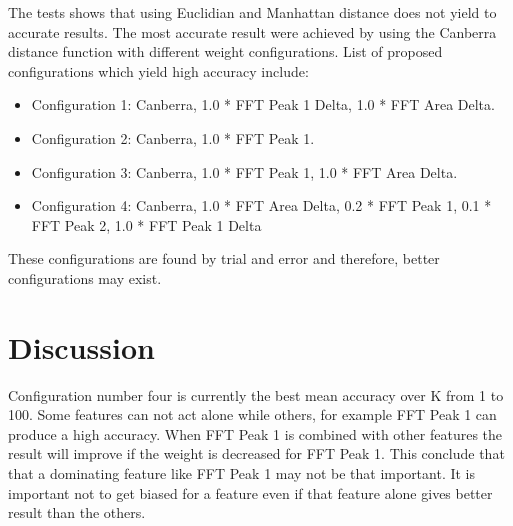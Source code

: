 The tests shows that using Euclidian and Manhattan distance does not yield to accurate results.
The most accurate result were achieved by using the Canberra distance function with different
weight configurations. List of proposed configurations which yield high accuracy include:
\begin{itemize}
  \item Configuration 1: Canberra, 1.0 * FFT Peak 1 Delta, 1.0 * FFT Area Delta.
  \item Configuration 2: Canberra, 1.0 * FFT Peak 1.
  \item Configuration 3: Canberra, 1.0 * FFT Peak 1, 1.0 * FFT Area Delta.
  \item Configuration 4: Canberra, 1.0 * FFT Area Delta, 0.2 * FFT Peak 1, 0.1 * FFT Peak 2, 1.0 * FFT Peak 1 Delta
\end{itemize}

These configurations are found by trial and error and therefore, better configurations may exist.

\section{Discussion}
Configuration number four is currently the best mean accuracy over K from 1 to 100.
Some features can not act alone while others, for example FFT Peak 1 can produce a high accuracy.
When FFT Peak 1 is combined with other features the result will improve if the
weight is decreased for FFT Peak 1. This conclude that that a dominating feature
like FFT Peak 1 may not be that important. It is important not to get biased for
a feature even if that feature alone gives better result than the others.
